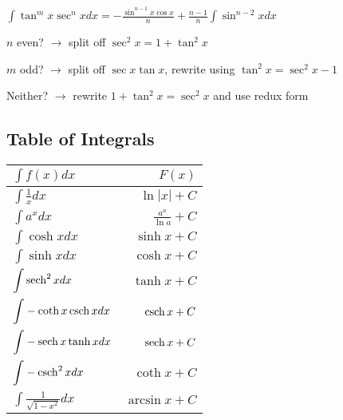 $\displaystyle{\int \tan^{m}{x}\sec^{n}{x}dx = -\frac{\sin^{n-1}{x}\cos{x}}{n} + \frac{n-1}{n}\int \sin^{n-2}{x}dx}$

$n$ even? $\rightarrow$ split off $\sec^{2}{x} = 1 + \tan^{2}{x}$

$m$ odd? $\rightarrow$ split off $\sec{x}\tan{x}$, rewrite using $\tan^{2}{x} = \sec^{2}{x} - 1$

Neither? $\rightarrow$ rewrite $1 + \tan^{2}{x} = \sec^{2}{x}$ and use redux form

\subsection{Table of Integrals}

\begin{center}

\begin{tabular}{l|r}

$\displaystyle{\int} f(x)dx$                          & $F(x)$          \\ \hline

$\displaystyle{\int} \frac{1}{x}dx$                   & $\ln{|x|}   + C$\\ \hline

$\displaystyle{\int} a^{x}dx$                         & $\frac{a^{x}}{\ln{a}} + C$   \\ \hline

$\displaystyle{\int} \cosh{x} dx$                     & $\sinh{x} + C$  \\ \hline

$\displaystyle{\int} \sinh{x} dx$                     & $\cosh{x} + C$  \\ \hline

$\displaystyle{\int} \operatorname{sech}^{2}{x} dx$                 & $\tanh{x} + C$  \\ \hline

$\displaystyle{\int} -\coth{x}\operatorname{csch}{x} dx$            & $\operatorname{csch}{x} + C$  \\ \hline

$\displaystyle{\int} -\operatorname{sech}{x}\tanh{x} dx$            & $\operatorname{sech}{x} + C$  \\ \hline

$\displaystyle{\int} -\operatorname{csch}^2{}{x} dx$                & $\coth{x} + C$  \\ \hline

$\displaystyle{\int} \frac{1}{\sqrt{1-x^{2}}} dx$     & $\arcsin{x} + C$\\ \hline


\end{tabular}
\end{center}
